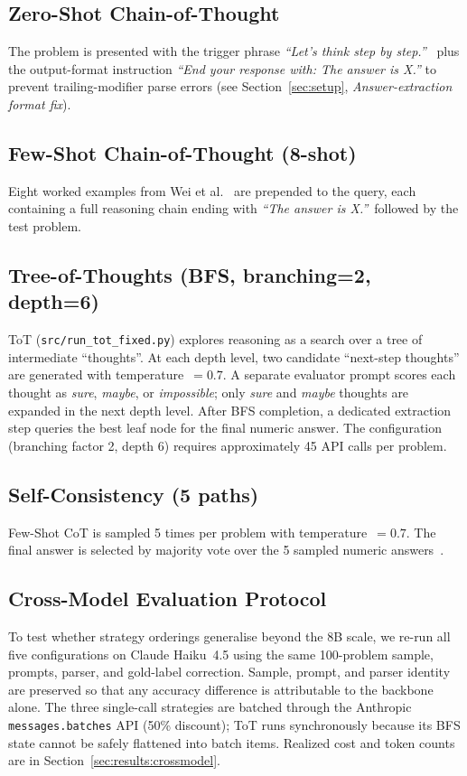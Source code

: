 ﻿\documentclass[runningheads]{llncs}
\begin{document}
\subsection{Zero-Shot Chain-of-Thought}
The problem is presented with the trigger phrase
\textit{``Let's think step by step.''}~\cite{kojima2022zeroshot}
plus the output-format instruction
\textit{``End your response with: The answer is X.''}
to prevent trailing-modifier parse errors
(see Section~\ref{sec:setup}, \emph{Answer-extraction format fix}).

\subsection{Few-Shot Chain-of-Thought (8-shot)}
Eight worked examples from Wei et al.~\cite{wei2022cot} are prepended
to the query, each containing a full reasoning chain ending with
\textit{``The answer is X.''}\ followed by the test problem.

\subsection{Tree-of-Thoughts (BFS, branching=2, depth=6)}
\label{sec:method:totfixed}
ToT (\texttt{src/run\_tot\_fixed.py}) explores reasoning as a search over
a tree of intermediate ``thoughts''.
At each depth level, two candidate ``next-step thoughts'' are generated
with temperature~$= 0.7$.
A separate evaluator prompt scores each thought as
\textit{sure}, \textit{maybe}, or \textit{impossible}; only \textit{sure}
and \textit{maybe} thoughts are expanded in the next depth level.
After BFS completion, a dedicated extraction step queries the best leaf
node for the final numeric answer.
The configuration (branching factor 2, depth 6) requires approximately
45 API calls per problem.

\subsection{Self-Consistency (5 paths)}
Few-Shot CoT is sampled 5 times per problem with temperature~$= 0.7$.
The final answer is selected by majority vote over the 5 sampled
numeric answers~\cite{wang2022selfconsistency}.

\subsection{Cross-Model Evaluation Protocol}
\label{sec:method:crossmodel}
To test whether strategy orderings generalise beyond the 8B scale, we
re-run all five configurations on Claude Haiku~4.5 using the same
100-problem sample, prompts, parser, and gold-label correction.
Sample, prompt, and parser identity are preserved so that any accuracy
difference is attributable to the backbone alone.
The three single-call strategies are batched through the Anthropic
\texttt{messages.batches} API (50\% discount); ToT runs synchronously
because its BFS state cannot be safely flattened into batch items.
Realized cost and token counts are in Section~\ref{sec:results:crossmodel}.
\end{document}
